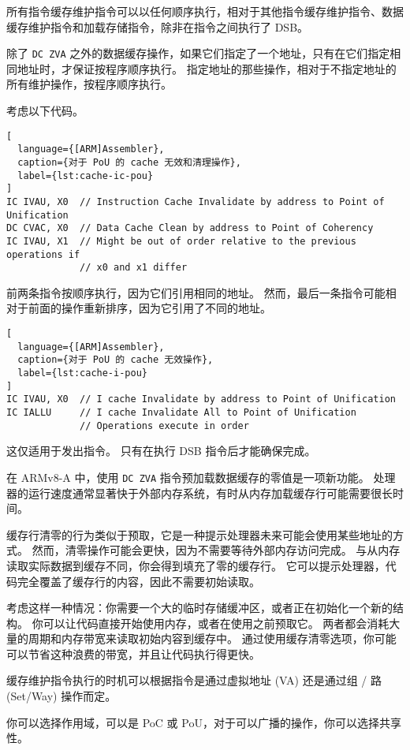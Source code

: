 所有指令缓存维护指令可以以任何顺序执行，相对于其他指令缓存维护指令、数据缓存维护指令和加载存储指令，除非在指令之间执行了 DSB。

除了 \lstinline!DC ZVA! 之外的数据缓存操作，如果它们指定了一个地址，只有在它们指定相同地址时，才保证按程序顺序执行。
指定地址的那些操作，相对于不指定地址的所有维护操作，按程序顺序执行。

考虑以下代码。

\begin{lstlisting}[
  language={[ARM]Assembler},
  caption={对于 PoU 的 cache 无效和清理操作},
  label={lst:cache-ic-pou}
]
IC IVAU, X0  // Instruction Cache Invalidate by address to Point of Unification
DC CVAC, X0  // Data Cache Clean by address to Point of Coherency
IC IVAU, X1  // Might be out of order relative to the previous operations if
             // x0 and x1 differ
\end{lstlisting}

前两条指令按顺序执行，因为它们引用相同的地址。
然而，最后一条指令可能相对于前面的操作重新排序，因为它引用了不同的地址。

\begin{lstlisting}[
  language={[ARM]Assembler},
  caption={对于 PoU 的 cache 无效操作},
  label={lst:cache-i-pou}
]
IC IVAU, X0  // I cache Invalidate by address to Point of Unification
IC IALLU     // I cache Invalidate All to Point of Unification
             // Operations execute in order
\end{lstlisting}

这仅适用于发出指令。
只有在执行 DSB 指令后才能确保完成。

在 ARMv8-A 中，使用 \lstinline!DC ZVA! 指令预加载数据缓存的零值是一项新功能。
处理器的运行速度通常显著快于外部内存系统，有时从内存加载缓存行可能需要很长时间。

缓存行清零的行为类似于预取，它是一种提示处理器未来可能会使用某些地址的方式。
然而，清零操作可能会更快，因为不需要等待外部内存访问完成。
与从内存读取实际数据到缓存不同，你会得到填充了零的缓存行。
它可以提示处理器，代码完全覆盖了缓存行的内容，因此不需要初始读取。

考虑这样一种情况：你需要一个大的临时存储缓冲区，或者正在初始化一个新的结构。
你可以让代码直接开始使用内存，或者在使用之前预取它。
两者都会消耗大量的周期和内存带宽来读取初始内容到缓存中。
通过使用缓存清零选项，你可能可以节省这种浪费的带宽，并且让代码执行得更快。

缓存维护指令执行的时机可以根据指令是通过虚拟地址 (VA) 还是通过组 / 路 (Set/Way) 操作而定。

你可以选择作用域，可以是 PoC 或 PoU，对于可以广播的操作，你可以选择共享性。

